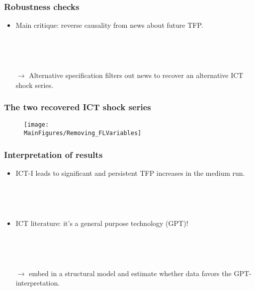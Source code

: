 \documentclass{beamer}
\def \MainFigures{../Draft_Summer2018/MainFigures}
\begin{document}
\begin{frame}
	\frametitle{Robustness checks}
	\label{robustness_checks}
	
\begin{itemize}
\item Main critique: reverse causality from news about future TFP.

\

\

\item[$\rightarrow$] Alternative specification filters out news to recover an alternative ICT shock series. 

\hyperlink{controlling_news}{}	
\end{itemize}

\end{frame}

\begin{frame}
	\frametitle{The two recovered ICT shock series}
	
\begin{figure}[h!]
\texttt{[image: \\MainFigures/Removing\_FLVariables]}
\end{figure}	

\end{frame}

\begin{frame}
	\frametitle{Interpretation of results}
	
	\begin{itemize}
	\item ICT-I leads to significant and persistent TFP increases in the medium run.
	
	\
	
	\
	
	\item ICT literature: it's a general purpose technology (GPT)!
	
	\
	
	\
	
	\item[$\rightarrow$] embed in a structural model and estimate whether data favors the GPT-interpretation.
	\end{itemize}

	
	
	
	

\end{frame}

\end{document}

